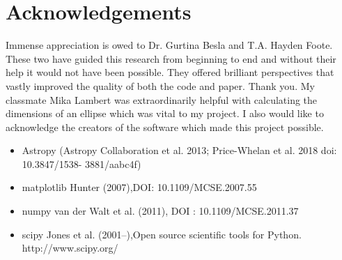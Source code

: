 \documentclass[usenatbib]{mnras}
\begin{document}
\section{Acknowledgements}
Immense appreciation is owed to Dr. Gurtina Besla and T.A. Hayden Foote. These two have guided this research from beginning to end and without their help it would not have been possible. They offered brilliant perspectives that vastly improved the quality of both the code and paper. Thank you. My classmate Mika Lambert was extraordinarily helpful with calculating the dimensions of an ellipse which was vital to my project. I also would like to acknowledge the creators of the software which made this project possible. 
\begin{itemize}
    \item Astropy (Astropy Collaboration et al. 2013; Price-Whelan et al. 2018 doi: 10.3847/1538-
    3881/aabc4f)
    \item matplotlib Hunter (2007),DOI: 10.1109/MCSE.2007.55
    \item numpy van der Walt et al. (2011), DOI : 10.1109/MCSE.2011.37
    \item scipy Jones et al. (2001–),Open source scientific tools for Python. http://www.scipy.org/
\end{itemize}



 



\bsp	%
\label{lastpage}
\end{document}
